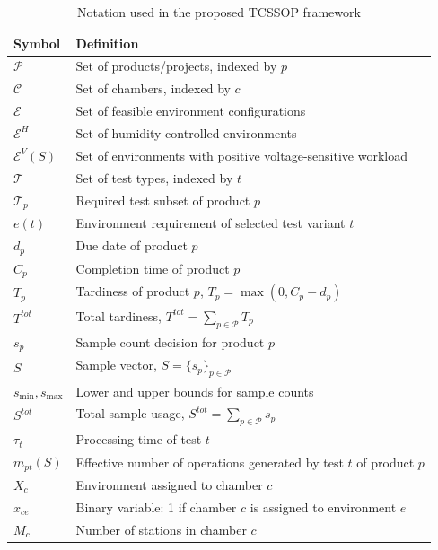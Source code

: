 \documentclass[11pt]{article}
\begin{document}
\begin{table}[H]
\centering
\caption{Notation used in the proposed TCSSOP framework}
\label{tab:notation_short}
\small
\begin{tabular}{|l|l|}
\hline
\textbf{Symbol} & \textbf{Definition} \\
\hline
\(\mathcal{P}\) & Set of products/projects, indexed by \(p\) \\ \hline
\(\mathcal{C}\) & Set of chambers, indexed by \(c\) \\ \hline
\(\mathcal{E}\) & Set of feasible environment configurations \\ \hline
\(\mathcal{E}^{H}\) & Set of humidity-controlled environments \\ \hline
\(\mathcal{E}^{V}(S)\) & Set of environments with positive voltage-sensitive workload \\ \hline
\(\mathcal{T}\) & Set of test types, indexed by \(t\) \\ \hline
\(\mathcal{T}_p\) & Required test subset of product \(p\) \\ \hline
\(e(t)\) & Environment requirement of selected test variant \(t\) \\ \hline
\(d_p\) & Due date of product \(p\) \\ \hline
\(C_p\) & Completion time of product \(p\) \\ \hline
\(T_p\) & Tardiness of product \(p\), \(T_p=\max(0,C_p-d_p)\) \\ \hline
\(T^{tot}\) & Total tardiness, \(T^{tot}=\sum_{p\in\mathcal{P}}T_p\) \\ \hline
\(s_p\) & Sample count decision for product \(p\) \\ \hline
\(S\) & Sample vector, \(S=\{s_p\}_{p\in\mathcal{P}}\) \\ \hline
\(s_{\min},s_{\max}\) & Lower and upper bounds for sample counts \\ \hline
\(S^{tot}\) & Total sample usage, \(S^{tot}=\sum_{p\in\mathcal{P}}s_p\) \\ \hline
\(\tau_t\) & Processing time of test \(t\) \\ \hline
\(m_{pt}(S)\) & Effective number of operations generated by test \(t\) of product \(p\) \\ \hline
\(X_c\) & Environment assigned to chamber \(c\) \\ \hline
\(x_{ce}\) & Binary variable: 1 if chamber \(c\) is assigned to environment \(e\) \\ \hline
\(M_c\) & Number of stations in chamber \(c\) \\ \hline

\end{tabular}
\end{table}
\end{document}
